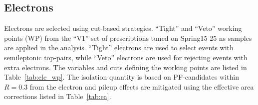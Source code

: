 \subsection{Electrons}
\label{subsec:obj_electron}

Electrons are selected using cut-based strategies. ``Tight'' and ``Veto'' working points (WP) from the ``V1'' set of prescriptions tuned on Spring15 25 ns samples are applied in the analysis. ``Tight'' electrons are used to select events with semileptonic top-pairs, while ``Veto'' electrons are used for rejecting events with extra electrons. The variables and cuts defining the working points are listed in Table~\ref{tab:ele_wp}. The isolation quantity is based on PF-candidates within $R=0.3$ from the electron and pileup effects are mitigated using the effective area corrections listed in Table~\ref{tab:ea}. %



